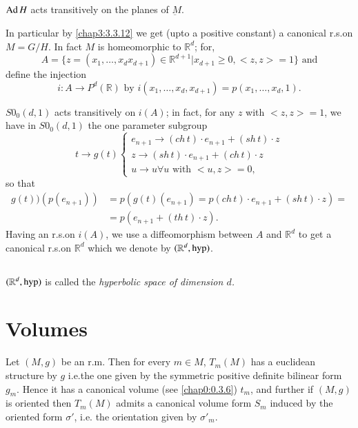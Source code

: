 \setcounter{subsection}{20}
\subsection{}\label{chap3:3.4.21}
$\operatorname{Ad} H$ acts transitively on the planes of $\underbar{M}$.

In particular by \ref{chap3:3.3.12} we get (upto a positive constant) a
canonical r.s.\@ on $M=G/H$. In fact $M$ is homeomorphic to
$\mathbb{R}^{d}$; for,
\begin{equation*}
A=\{z=(x_{1},\ldots,x_{d}x_{d+1})\in\mathbb{R}^{d+1}|x_{d+1}\geq
0,<z,z>=1\}\text{ \ and}
\end{equation*}
define \pageoriginale the injection 
$$i:A\to P^{d}(\mathbb{R}) \mbox{ by }
i(x_{1},\ldots,x_{d},x_{d+1})=p(x_{1},\ldots,x_{d},1).$$

\begin{claim*}
$S0_{0}(d,1)$ acts transitively on $i(A)$; in fact, for any $z$ with
  $<z,z>=1$, we have in $S0_{0}(d,1)$ the one parameter subgroup 
$$
t\to g(t)
\begin{cases}
e_{n+1}\to (ch\, t)\cdot e_{n+1}+(sh\, t)\cdot z\\
z\to (sh\, t)\cdot e_{n+1}+(ch\, t)\cdot z\\
u\to u\forall u\text{ \ with } <u,z>=0,
\end{cases}
$$
so that
\begin{align*}
g(t))(p(e_{n+1})) &= p(g(t)(e_{n+1})=p(ch\, t)\cdot e_{n+1}+(sh\,
t)\cdot z)=\\
&= p(e_{n+1}+(th\, t)\cdot z).
\end{align*}
Having an r.s.\@ on $i(A)$, we use a diffeomorphism between $A$ and
$\mathbb{R}^{d}$ to get a canonical r.s.\@ on $\mathbb{R}^{d}$ which
we denote by $(\mathbb{R}^{d},\operatorname{hyp})$.
\end{claim*}

\setcounter{subsection}{21}
\subsection{}\label{chap3:3.4.22}
$(\mathbb{R}^{d},\operatorname{hyp})$ is called the {\em hyperbolic space of
  dimension $d$.}

\section{Volumes}\label{chap3:sec5}

\quad 
Let $(M,g)$ be an r.m. Then for every $m\in M$, $T_{m}(M)$ has a
euclidean structure by $g$ i.e.\@ the one given by the symmetric
positive definite bilinear form $g_{m}$. Hence it has a canonical
volume (see \ref{chap0:0.3.6}) $t_{m}$, and further if $(M,g)$ is oriented
then $T_{m}(M)$ admits a canonical volume form $S_{m}$ induced by the
oriented form $\sigma'$, i.e. the orientation given by $\sigma'_{m}$.

